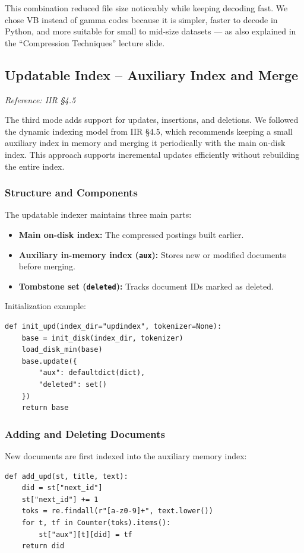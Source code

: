 \documentclass[11pt,a4paper]{article}
\begin{document}
This combination reduced file size noticeably while keeping decoding fast.
We chose VB instead of gamma codes because it is simpler, faster to decode in Python, and more suitable for small to mid-size datasets — 
as also explained in the “Compression Techniques” lecture slide.

\subsection{Updatable Index – Auxiliary Index and Merge}
\label{subsec:updatable}
\textit{Reference: IIR §4.5}

The third mode adds support for updates, insertions, and deletions.  
We followed the dynamic indexing model from IIR §4.5, which recommends keeping a small auxiliary index in memory and merging it periodically with the main on-disk index.
This approach supports incremental updates efficiently without rebuilding the entire index.

\subsubsection{Structure and Components}

The updatable indexer maintains three main parts:
\begin{itemize}
    \item \textbf{Main on-disk index:} The compressed postings built earlier.
    \item \textbf{Auxiliary in-memory index (\texttt{aux}):} Stores new or modified documents before merging.
    \item \textbf{Tombstone set (\texttt{deleted}):} Tracks document IDs marked as deleted.
\end{itemize}

Initialization example:
\begin{verbatim}
def init_upd(index_dir="updindex", tokenizer=None):
    base = init_disk(index_dir, tokenizer)
    load_disk_min(base)
    base.update({
        "aux": defaultdict(dict),
        "deleted": set()
    })
    return base
\end{verbatim}

\subsubsection{Adding and Deleting Documents}

New documents are first indexed into the auxiliary memory index:
\begin{verbatim}
def add_upd(st, title, text):
    did = st["next_id"]
    st["next_id"] += 1
    toks = re.findall(r"[a-z0-9]+", text.lower())
    for t, tf in Counter(toks).items():
        st["aux"][t][did] = tf
    return did
\end{verbatim}
\end{document}
